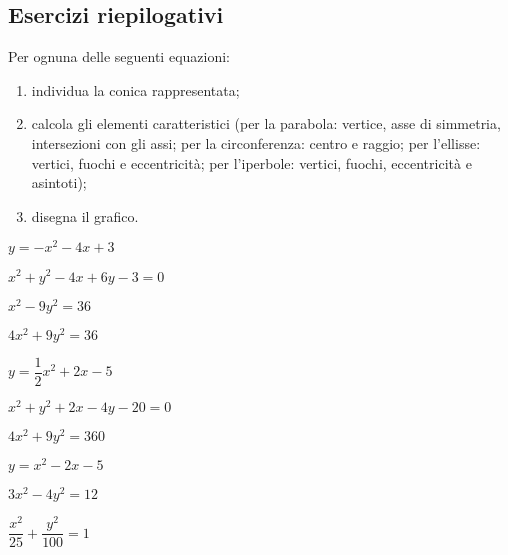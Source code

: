 \subsection{Esercizi riepilogativi}


\begin{esercizio}\label{ese:03.1}
Per ognuna delle seguenti equazioni:
\begin{enumerate} [nosep]
 \item individua la conica rappresentata;
 \item calcola gli elementi caratteristici (per la parabola: vertice, asse 
di simmetria, intersezioni con gli assi; per la circonferenza: centro e 
raggio; per l'ellisse: vertici, fuochi e eccentricità; per l'iperbole: 
vertici, fuochi, eccentricità e asintoti);
 \item disegna il grafico.
\end{enumerate}

\begin{multicols}{2}
 \begin{enumeratea}
  \item  \(y=-x^2-4x+3\)
  \item  \(x^2+y^2-4x+6y-3=0\)
  \item  \(x^2-9y^2=36\)
  \item  \(4x^2+9y^2=36\)
  \item  \(y=\dfrac{1}{2}x^2+2x-5\)
  \item  \(x^2+y^2+2x-4y-20=0\)
  \item  \(4x^2+9y^2=360\)
  \item  \(y=x^2-2x-5\)
  \item  \(3x^2-4y^2=12\)
  \item  \(\dfrac{x^2}{25}+\dfrac{y^2}{100}=1\)
 \end{enumeratea}
\end{multicols}
\end{esercizio}

